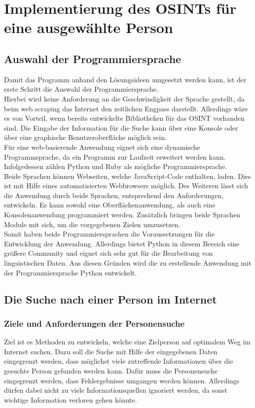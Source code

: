 
\chapter{Implementierung des OSINTs für eine ausgewählte Person}  %
\label{cha:Informationsbeschaffung einer ausgewählten Person} %
\section{Auswahl der Programmiersprache}
Damit das Programm anhand den Lösungsideen umgesetzt werden kann, ist der erste Schritt die Auswahl der Programmiersprache.\\
Hierbei wird keine Anforderung an die Geschwindigkeit der Sprache gestellt, da beim web scraping das Internet den zeitlichen Engpass darstellt. Allerdings wäre es von Vorteil, wenn bereits entwickelte Bibliotheken für das OSINT vorhanden sind. Die Eingabe der Information für die Suche kann über eine Konsole oder über eine graphische Benutzeroberfläche möglich sein.\\
Für eine web-basierende Anwendung eignet sich eine dynamische Programmsprache, da ein Programm zur Laufzeit erweitert werden kann. Infolgedessen zählen Python und Ruby als mögliche Programmiersprache.\\
Beide Sprachen können Webseiten, welche JavaScript-Code enthalten, laden. Dies ist mit Hilfe eines automatisierten Webbrowsers möglich. Des Weiteren lässt sich die Anwendung durch beide Sprachen, entsprechend den Anforderungen, entwickeln. Es kann sowohl eine Oberflächenanwendung, als auch eine Konsolenanwendung programmiert werden. Zusätzlich bringen beide Sprachen Module mit sich, um die vorgegebenen Zielen umzusetzen.\\ Somit haben beide Programmiersprachen die Voraussetzungen für die Entwicklung der Anwendung. Allerdings bietet Python in diesem Bereich eine größere Community und eignet sich sehr gut für die Bearbeitung von linguistischen Daten. \cite{bird2009natural}Aus diesen Gründen wird die zu erstellende Anwendung mit der Programmiersprache Python entwickelt.

\section{Die Suche nach einer Person im Internet}
	\subsection{Ziele und Anforderungen der Personensuche}
	Ziel ist es Methoden zu entwickeln, welche eine Zielperson auf optimalem Weg im Internet suchen. Dazu soll die Suche mit Hilfe der eingegebenen Daten eingegrenzt werden, dass möglichst viele zutreffende Informationen über die gesuchte Person gefunden werden kann. Dafür muss die Personensuche eingegrenzt werden, dass Fehlergebnisse umgangen werden können. Allerdings dürfen dabei nicht zu viele Informationsquellen ignoriert werden, da sonst wichtige Information verloren gehen könnte.
	

